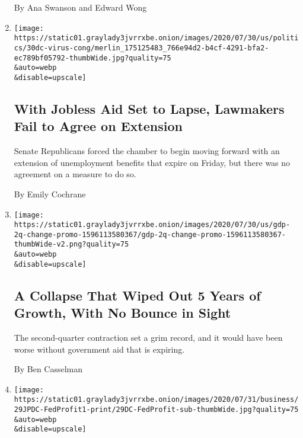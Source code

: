 \begin{enumerate}
  By Ana Swanson and Edward Wong
\item
  \href{/2020/07/30/us/politics/senate-virus-aid.html}{}

  \texttt{[image: https://static01.graylady3jvrrxbe.onion/images/2020/07/30/us/politics/30dc-virus-cong/merlin\_175125483\_766e94d2-b4cf-4291-bfa2-ec789bf05792-thumbWide.jpg?quality=75\\\&auto=webp\\\&disable=upscale]}

  \hypertarget{with-jobless-aid-set-to-lapse-lawmakers-fail-to-agree-on-extension}{%
  \subsection{With Jobless Aid Set to Lapse, Lawmakers Fail to Agree on
  Extension}\label{with-jobless-aid-set-to-lapse-lawmakers-fail-to-agree-on-extension}}

  Senate Republicans forced the chamber to begin moving forward with an
  extension of unemployment benefits that expire on Friday, but there
  was no agreement on a measure to do so.

  By Emily Cochrane
\item
  \href{/2020/07/30/business/economy/q2-gdp-coronavirus-economy.html}{}

  \texttt{[image: https://static01.graylady3jvrrxbe.onion/images/2020/07/30/us/gdp-2q-change-promo-1596113580367/gdp-2q-change-promo-1596113580367-thumbWide-v2.png?quality=75\\\&auto=webp\\\&disable=upscale]}

  \hypertarget{a-collapse-that-wiped-out-5-years-of-growth-with-no-bounce-in-sight}{%
  \subsection{A Collapse That Wiped Out 5 Years of Growth, With No
  Bounce in
  Sight}\label{a-collapse-that-wiped-out-5-years-of-growth-with-no-bounce-in-sight}}

  The second-quarter contraction set a grim record, and it would have
  been worse without government aid that is expiring.

  By Ben Casselman
\item
  \href{/2020/07/30/business/economy/fed-talf-wall-street.html}{}

  \texttt{[image: https://static01.graylady3jvrrxbe.onion/images/2020/07/31/business/29JPDC-FedProfit1-print/29DC-FedProfit-sub-thumbWide.jpg?quality=75\\\&auto=webp\\\&disable=upscale]}

  \hypertarget{how-pimcos-cayman-based-hedge-fund-can-profit-from-the-feds-rescue}{%
}
\end{enumerate}
